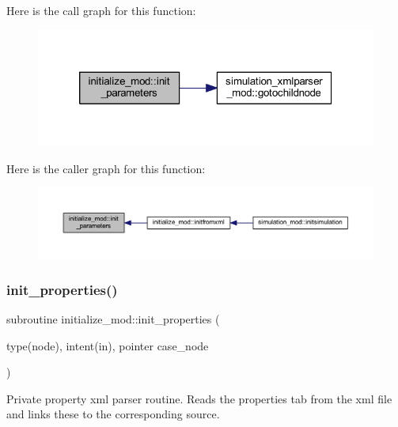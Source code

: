 Here is the call graph for this function\+:\nopagebreak
\begin{figure}[H]
\begin{center}
\leavevmode
\includegraphics[width=320pt]{namespaceinitialize__mod_aac9d9dabb797c83e360f9ae60a7e65e3_cgraph}
\end{center}
\end{figure}
Here is the caller graph for this function\+:\nopagebreak
\begin{figure}[H]
\begin{center}
\leavevmode
\includegraphics[width=350pt]{namespaceinitialize__mod_aac9d9dabb797c83e360f9ae60a7e65e3_icgraph}
\end{center}
\end{figure}
\mbox{\label{namespaceinitialize__mod_a4c7a93dca8bb7b573e91f877033ab22a}} 
\subsubsection{\texorpdfstring{init\+\_\+properties()}{init\_properties()}}
{\footnotesize\ttfamily subroutine initialize\+\_\+mod\+::init\+\_\+properties (\begin{DoxyParamCaption}\item[{type(node), intent(in), pointer}]{case\+\_\+node }\end{DoxyParamCaption})\hspace{0.3cm}{\ttfamily [private]}}



Private property xml parser routine. Reads the properties tab from the xml file and links these to the corresponding source. 

